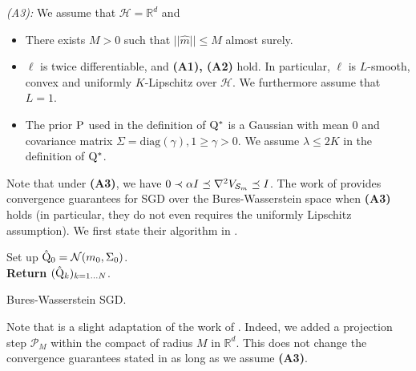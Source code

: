 \textit{(A3):} We assume that $\mathcal{H}=\mathbb{R}^d$ and
\begin{itemize}
  \item There exists $M>0$ such that $||\hat{m}|| \leq M$ almost surely.
  \item $\ell$ is twice differentiable, and \textbf{(A1), (A2)} hold. In particular, $\ell$ is $L$-smooth, convex and uniformly $K$-Lipschitz over $\mathcal{H}$. We furthermore assume that $L=1$.
  \item The prior $\P$ used in the definition of $\Q^*$ is a Gaussian with mean $0$ and covariance matrix $\Sigma= \text{diag}(\gamma), 1\geq\gamma>0$. We assume $\lambda \leq 2K$ in the definition of $\Q^*$.
\end{itemize}
Note that under \textbf{(A3)}, we have $0 \prec \alpha I \preceq \nabla^2 V_{\Sm} \preceq I$.
The work of \citet[Theorem 4]{lambert2022variational} provides convergence guarantees for SGD over the Bures-Wasserstein space when \textbf{(A3)} holds (in particular, they do not even requires the uniformly Lipschitz assumption). We first state their algorithm in .
\begin{algorithm}[ht]
\SetAlgoLined
{}
Set up $\hat{\Q}_0 = \mathcal{N}(m_0,\Sigma_0)$. \\
\textbf{Return} $(\hat{\Q}_k)_{k=1...N}$.
\caption{Bures-Wasserstein SGD.}
\label{alg: sgd}
\end{algorithm}
Note that  is a slight adaptation of the work of \citet{lambert2022variational}. Indeed, we added a projection step $\mathcal{P}_M$  within the compact of radius $M$ in $\mathbb{R}^d$. This does not change the convergence guarantees stated in  as long as we assume \textbf{(A3)}.

